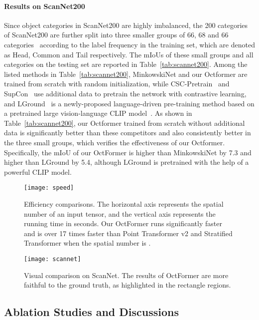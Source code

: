 \documentclass[acmtog,screen,authorversion]{acmart}
\begin{document}
\paragraph{Results on ScanNet200}
Since object categories in ScanNet200 are highly imbalanced, the 200 categories of ScanNet200 are further split into three smaller groups of 66, 68 and 66 categories~\cite{Rozen2022} according to the label frequency in the training set, which are denoted as Head, Common and Tail respectively.
The mIoUs of these small groups and all categories on the testing set are reported in Table~\ref{tab:scannet200}.
Among the listed methods in Table~\ref{tab:scannet200}, MinkowskiNet and our Octformer are trained from scratch with random initialization, while CSC-Pretrain~\cite{Hou2021} and SupCon~\cite{Khosla2020} use additional data to pretrain the network with contrastive learning, and LGround~\cite{Rozen2022} is a newly-proposed language-driven pre-training method based on a pretrained large vision-language CLIP model~\cite{Radford2021}.
As shown in Table~\ref{tab:scannet200}, our Octformer trained from scratch without additional data is significantly better than these competitors and also consistently better in the three small groups, which verifies the effectiveness of our Octformer.
Specifically, the mIoU of our OctFormer is higher than MinkowskiNet by 7.3 and higher than LGround by 5.4, although LGround is pretrained with the help of a powerful CLIP model.



\begin{figure}[t]
  \centering
  \texttt{[image: speed]}
  \caption{Efficiency comparisons. The horizontal axis represents the spatial number of an input tensor, and the vertical axis represents the running time in seconds.
  Our OctFormer runs significantly faster and is over 17 times faster than Point Transformer v2 and Stratified Transformer when the spatial number is .   }
  \label{fig:efficiency}
\end{figure}

\begin{figure}[t]
  \centering
  \texttt{[image: scannet]}
  \caption{Visual comparison on ScanNet. The results of OctFormer are more faithful to the ground truth, as highlighted in the rectangle regions.}
  \label{fig:scannet}
\end{figure}


\subsection{Ablation Studies and Discussions} \label{subsec:ablation}
\end{document}

